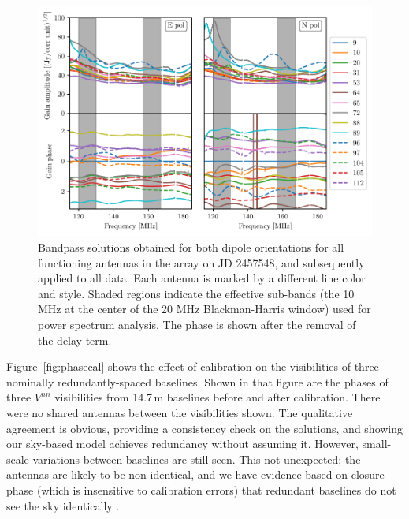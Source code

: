 \documentclass[twocolumn, trackchanges]{aastex61}
\begin{document}
\begin{figure}
\centering
\includegraphics[scale=0.5]{gains.pdf}
\caption{Bandpass solutions obtained for both dipole orientations for all
  functioning antennas in the array on JD 2457548, and subsequently applied to
  all data.  Each antenna is marked by a different line color and style. Shaded
  regions indicate the effective sub-bands (the 10 MHz at the center of the 20
  MHz Blackman-Harris window) used for power spectrum analysis.  The phase is
  shown after the removal of the delay term.}
\label{fig:bandpass} 
\end{figure}

Figure~\ref{fig:phasecal} shows the effect of calibration on the visibilities of
three nominally redundantly-spaced baselines.  Shown in that figure are the
phases of three $V^{nn}$ visibilities from 14.7\,m baselines before and after
calibration. There were no shared antennas between the visibilities shown. The
qualitative agreement is obvious, providing a consistency check on the
solutions, and showing our sky-based model achieves redundancy without assuming
it.  However, small-scale variations between baselines are still seen.  This not
unexpected; the antennas are likely to be non-identical, and we have evidence
based on closure phase (which is insensitive to calibration errors) that
redundant baselines do not see the sky identically \citep{carilli18}.
\end{document}
